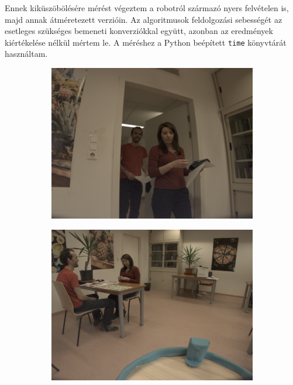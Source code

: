 Ennek kiküszöbölésére mérést végeztem a robotról származó nyers felvételen is, majd annak átméretezett verzióin. Az algoritmusok feldolgozási sebességét az esetleges szükséges bemeneti konverziókkal együtt, azonban az eredmények kiértékelése nélkül mértem le. A méréshez a Python beépített \lstinline{time} könyvtárát használtam.

\begin{figure}
    \centering
    \begin{subfigure}[b]{0.45\linewidth}
        \includegraphics[width=\linewidth]{figures/video_examples/video_example_door.png}
    \end{subfigure}
    \begin{subfigure}[b]{0.45\linewidth}
        \includegraphics[width=\linewidth]{figures/video_examples/video_example_table_1.png}

\end{subfigure}
\end{figure}
